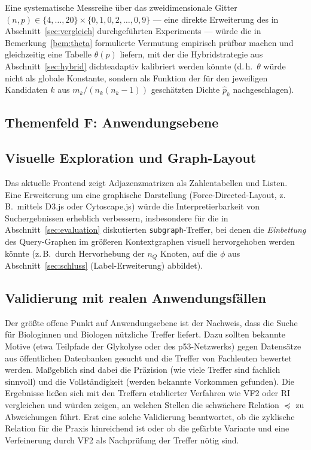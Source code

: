 \documentclass[a4paper,12pt, twoside]{report}
\theoremstyle{definition}
\begin{document}
Eine systematische Messreihe über das zweidimensionale Gitter $(n,p)\in\{4,\ldots,20\}\times\{0{,}1,0{,}2,\ldots,0{,}9\}$ — eine direkte Erweiterung des in Abschnitt~\ref{sec:vergleich} durchgeführten Experiments — würde die in Bemerkung~\ref{bem:theta} formulierte Vermutung empirisch prüfbar machen und gleichzeitig eine Tabelle $\theta(p)$ liefern, mit der die Hybridstrategie aus Abschnitt~\ref{sec:hybrid} dichteadaptiv kalibriert werden könnte (d.\,h.\ $\theta$ würde nicht als globale Konstante, sondern als Funktion der für den jeweiligen Kandidaten $k$ aus $m_k/(n_k(n_k-1))$ geschätzten Dichte $\hat p_k$ nachgeschlagen).


\subsection*{Themenfeld F: Anwendungsebene}

\subsection{Visuelle Exploration und Graph-Layout}

Das aktuelle Frontend zeigt Adjazenzmatrizen als Zahlentabellen und Listen. Eine Erweiterung um eine graphische Darstellung (Force-Directed-Layout, z.\,B.\ mittels D3.js oder Cytoscape.js) würde die Interpretierbarkeit von Suchergebnissen erheblich verbessern, insbesondere für die in Abschnitt~\ref{sec:evaluation} diskutierten \texttt{subgraph}-Treffer, bei denen die \emph{Einbettung} des Query-Graphen im größeren Kontextgraphen visuell hervorgehoben werden könnte (z.\,B.\ durch Hervorhebung der $n_Q$ Knoten, auf die $\phi$ aus Abschnitt~\ref{sec:schluss} (Label-Erweiterung) abbildet).


\subsection{Validierung mit realen Anwendungsfällen}

Der größte offene Punkt auf Anwendungsebene ist der Nachweis, dass die Suche für Biologinnen und Biologen nützliche Treffer liefert. Dazu sollten bekannte Motive (etwa Teilpfade der Glykolyse oder des p53-Netzwerks) gegen Datensätze aus öffentlichen Datenbanken gesucht und die Treffer von Fachleuten bewertet werden. Maßgeblich sind dabei die Präzision (wie viele Treffer sind fachlich sinnvoll) und die Vollständigkeit (werden bekannte Vorkommen gefunden). Die Ergebnisse ließen sich mit den Treffern etablierter Verfahren wie VF2 oder RI vergleichen und würden zeigen, an welchen Stellen die schwächere Relation $\preceq$ zu Abweichungen führt. Erst eine solche Validierung beantwortet, ob die zyklische Relation für die Praxis hinreichend ist oder ob die gefärbte Variante und eine Verfeinerung durch VF2 als Nachprüfung der Treffer nötig sind.
\end{document}
